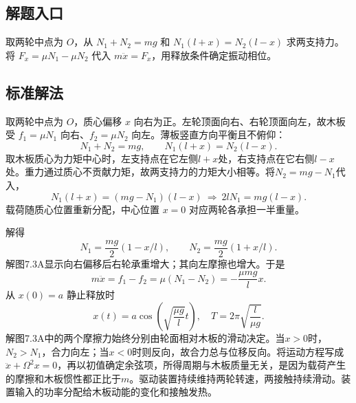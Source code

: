 \documentclass[UTF8,fontset=fandol,a4paper,11pt]{ctexart}
\newcommand{\figcaption}[1]{\par\vspace{2pt}{\small\color{muted}#1}\par}
\begin{document}


\subsection*{解题入口}

取两轮中点为 $O$，从 $N_1+N_2=mg$ 和 $N_1(l+x)=N_2(l-x)$ 求两支持力。将 $F_x=\mu N_1-\mu N_2$ 代入 $m\ddot x=F_x$，用释放条件确定振动相位。



\subsection*{标准解法}

\begin{center}\begin{minipage}{\linewidth}\centering{}\figcaption{解图 7.3A}\end{minipage}\end{center}
取两轮中点为 $O$，质心偏移 $x$ 向右为正。左轮顶面向右、右轮顶面向左，故木板受 $f_1=\mu N_1$ 向右、$f_2=\mu N_2$ 向左。薄板竖直方向平衡且不俯仰：
\[N_1+N_2=mg,\qquad N_1(l+x)=N_2(l-x).\]
取木板质心为力矩中心时，左支持点在它左侧$l+x$处，右支持点在它右侧$l-x$处。重力通过质心不贡献力矩，故两支持力的力矩大小相等。将$N_2=mg-N_1$代入，
\[N_1(l+x)=(mg-N_1)(l-x)
\ \Longrightarrow\ 2lN_1=mg(l-x).\]
载荷随质心位置重新分配，中心位置 $x=0$ 对应两轮各承担一半重量。

解得
\[N_1=\frac{mg}{2}(1-x/l),\qquad
N_2=\frac{mg}{2}(1+x/l).\]
解图7.3A显示向右偏移后右轮承重增大；其向左摩擦也增大。于是
\[m\ddot x=f_1-f_2=\mu(N_1-N_2)=-\frac{\mu mg}{l}x.\]
从 $x(0)=a$ 静止释放时
\[\boxed{x(t)=a\cos\left(\sqrt{\frac{\mu g}{l}}t\right),\quad
T=2\pi\sqrt{\frac l{\mu g}}.}\]
解图7.3A中的两个摩擦力始终分别由轮面相对木板的滑动决定。当$x>0$时，$N_2>N_1$，合力向左；当$x<0$时则反向，故合力总与位移反向。将运动方程写成$\ddot x+\Omega^2x=0$，再以初值确定余弦项，所得周期与木板质量无关，是因为载荷产生的摩擦和木板惯性都正比于$m$。驱动装置持续维持两轮转速，两接触持续滑动。装置输入的功率分配给木板动能的变化和接触发热。
\end{document}
